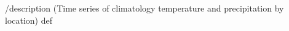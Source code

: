 \begin{ingrid}
/description (Time series of climatology temperature and precipitation by location) def
\end{ingrid}
